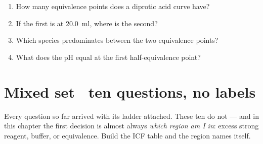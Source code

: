 \documentclass{apchem-worksheet}
\begin{document}
\begin{yourturn}
\begin{enumerate}[leftmargin=*,itemsep=0.5em]
  \item How many equivalence points does a diprotic acid curve have?
        \workspace[1.4cm]
  \item If the first is at \SI{20.0}{\milli\litre}, where is the
        second? \workspace[1.4cm]
  \item Which species predominates between the two equivalence points?
        \workspace[1.6cm]
  \item What does the pH equal at the first half-equivalence point?
        \workspace[1.6cm]
\end{enumerate}
\end{yourturn}

\section*{\sffamily Mixed set \textbullet\ ten questions, no labels}

\begin{apcnote}
Every question so far arrived with its ladder attached. These ten do
not --- and in this chapter the first decision is almost always
\emph{which region am I in}: excess strong reagent, buffer, or
equivalence. Build the ICF table and the region names itself.
\end{apcnote}
\end{document}

